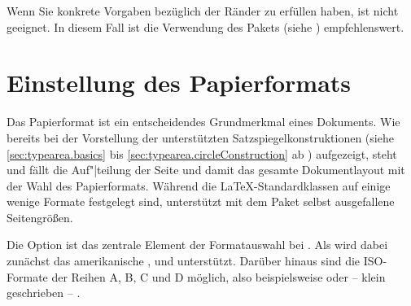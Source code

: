 \iftrue%
Wenn Sie konkrete Vorgaben bezüglich der Ränder zu erfüllen haben, ist
 nicht geeignet. In diesem Fall ist die Verwendung des
Pakets
 (siehe
\cite{package:geometry}) empfehlenswert.
%
\fi
\iffalse
%
Das Paket \Package{typearea} ist nicht dafür gedacht, bestimmte Randbreiten
einzustellen. Dafür ist das Paket \Package{geometry}\IndexPackage{geometry}
(siehe \cite{package:geometry}) empfehlenswert.
%
\fi


\section{Einstellung des Papierformats}%
%
\BeginIndexGroup

Das Papierformat ist ein entscheidendes Grundmerkmal eines Dokuments. Wie
bereits bei der Vorstellung der unterstützten Satzspiegelkonstruktionen (siehe
\autoref{sec:typearea.basics} bis \autoref{sec:typearea.circleConstruction} ab
)
aufgezeigt, steht und fällt die Auf"|teilung der Seite und damit das gesamte
Dokumentlayout mit der Wahl des Papierformats. Während die
\LaTeX-Standardklassen auf einige wenige Formate festgelegt sind, unterstützt
\KOMAScript{} mit dem Paket  selbst ausgefallene
Seitengrößen.


\begin{Declaration}
\end{Declaration}%
Die Option  ist das
zentrale Element der Formatauswahl %
bei \KOMAScript. Als  wird dabei zunächst das amerikanische
,  und  unterstützt. Darüber
hinaus sind die ISO-Formate der Reihen A, B, C und D möglich, also
beispielsweise  oder -- klein geschrieben -- . 

